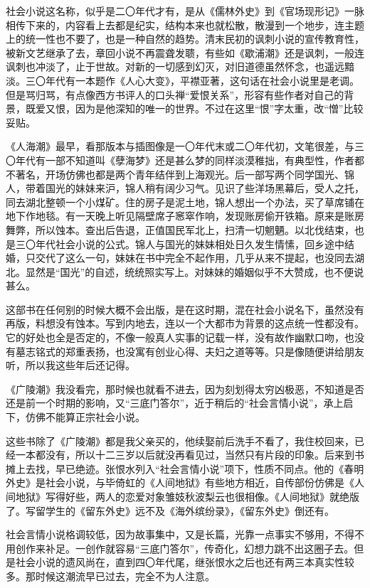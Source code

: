 \par 社会小说这名称，似乎是二〇年代才有，是从《儒林外史》到《官场现形记》一脉相传下来的，内容看上去都是纪实，结构本来也就松散，散漫到一个地步，连主题上的统一性也不要了，也是一种自然的趋势。清末民初的讽刺小说的宣传教育性，被新文艺继承了去，章回小说不再震聋发聩，有些如《歇浦潮》还是讽刺，一般连讽刺也冲淡了，止于世故。对新的一切感到幻灭，对旧道德虽然怀念，也遥远黯淡。三〇年代有一本题作《人心大变》，平襟亚著，这句话在社会小说里是老调。但是骂归骂，有点像西方书评人的口头禅“爱恨关系”，形容有些作者对自己的背景，既爱又恨，因为是他深知的唯一的世界。不过在这里“恨”字太重，改“憎”比较妥贴。
\par 《人海潮》最早，看那版本与插图像是一〇年代末或二〇年代初，文笔很差，与三〇年代有一部不知道叫《孽海梦》还是甚么梦的同样淡漠稚拙，有典型性，作者都不著名，开场仿佛也都是两个青年结伴到上海观光。后一部写两个同学国光、锦人，带着国光的妹妹来沪，锦人稍有阔少习气。见识了些洋场黑幕后，受人之托，同去湖北整顿一个小煤矿。住的房子是泥土地，锦人想出一个办法，买了草席铺在地下作地毯。有一天晚上听见隔壁席子窸窣作响，发现账房偷开铁箱。原来是账房舞弊，所以蚀本。查出后告退，正值国民军北上，扫清一切魍魉。以北伐结束，也是三〇年代社会小说的公式。锦人与国光的妹妹相处日久发生情愫，回乡途中结婚，只交代了这么一句，妹妹在书中完全不起作用，几乎从来不提起，也没同去湖北。显然是“国光”的自述，统统照实写上。对妹妹的婚姻似乎不大赞成，也不便说甚么。
\par 这部书在任何别的时候大概不会出版，是在这时期，混在社会小说名下，虽然没有再版，料想没有蚀本。写到内地去，连以一个大都市为背景的这点统一性都没有。它的好处也全是否定的，不像一般真人实事的记载一样，没有故作幽默口吻，也没有墓志铭式的郑重表扬，也没寓有创业心得、夫妇之道等等。只是像随便讲给朋友听，所以我这些年后还记得。
\par 《广陵潮》我没看完，那时候也就看不进去，因为刻划得太穷凶极恶，不知道是否还是前一个时期的影响，又“三底门答尔”，近于稍后的“社会言情小说”，承上启下，仿佛不能算正宗社会小说。
\par 这些书除了《广陵潮》都是我父亲买的，他续娶前后洗手不看了，我住校回来，已经一本都没有，所以十二三岁以后就没再看见过，当然只有片段的印象。后来到书摊上去找，早已绝迹。张恨水列入“社会言情小说”项下，性质不同点。他的《春明外史》是社会小说，与毕倚虹的《人间地狱》有些地方相近，自传部份仿佛是《人间地狱》写得好些，两人的恋爱对象雏妓秋波梨云也很相像。《人间地狱》就绝版了。写留学生的《留东外史》远不及《海外缤纷录》，《留东外史》倒还有。
\par 社会言情小说格调较低，因为故事集中，又是长篇，光靠一点事实不够用，不得不用创作来补足。一创作就容易“三底门答尔”，传奇化，幻想力跳不出这圈子去。但是社会小说的遗风尚在，直到四〇年代尾，继张恨水之后也还有两三本真实性较多。那时候这潮流早已过去，完全不为人注意。
